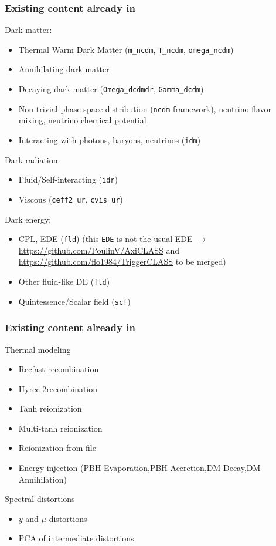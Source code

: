 \begin{frame}[fragile]
	\frametitle{Existing content already in \CLASS{}}
	Dark matter:
	\begin{itemize}
		\item Thermal Warm Dark Matter (\texttt{m\_ncdm}, \texttt{T\_ncdm}, \texttt{omega\_ncdm})
		\item Annihilating dark matter 
		\item Decaying dark matter (\texttt{Omega\_dcdmdr}, \texttt{Gamma\_dcdm})
		\item Non-trivial phase-space distribution (\texttt{ncdm} framework), neutrino flavor mixing, neutrino chemical potential
		\item Interacting with photons, baryons, neutrinos (\texttt{idm})
	\end{itemize}

	\pause
	Dark radiation:
	\begin{itemize}
		\item Fluid/Self-interacting (\texttt{idr})
		\item Viscous (\texttt{ceff2\_ur}, \texttt{cvis\_ur})
	\end{itemize}

	\pause
	Dark energy:
	\begin{itemize}
	\item CPL, EDE (\texttt{fld}) (this \texttt{EDE} is {\Red not} the usual EDE $\to$ \url{https://github.com/PoulinV/AxiCLASS} and \url{https://github.com/flo1984/TriggerCLASS} to be merged)
	\item Other fluid-like DE  (\texttt{fld})
	\item Quintessence/Scalar field   (\texttt{scf})
	\end{itemize}
\end{frame}


\begin{frame}[fragile]
	\frametitle{Existing content already in \CLASS{}}
	Thermal modeling
	\begin{itemize}
		\item Recfast recombination
		\item Hyrec-2recombination
		\item Tanh reionization
		\item Multi-tanh reionization
		\item Reionization from file
		\item Energy injection (PBH Evaporation,PBH Accretion,DM Decay,DM Annihilation)
	\end{itemize}
	
	\pause
	Spectral distortions
	\begin{itemize}
		\item $y$ and $\mu$ distortions
		\item PCA of intermediate distortions
	\end{itemize}

\end{frame}



